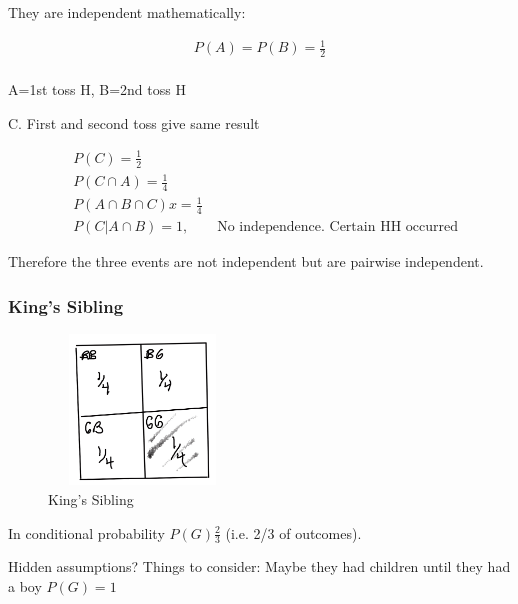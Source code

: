 They are independent mathematically:

\begin{align*}
P(A)=P(B)=\frac{1}{2}\\
\end{align*}

A={1st toss H}, B={2nd toss H}

C. First and second toss give same result

\begin{align*}
&P(C)=\frac{1}{2}\\
&P(C \cap A) = \frac{1}{4}\\
&P(A \cap B \cap C)x = \frac{1}{4}\\
&P(C|A \cap B) = 1, \qquad \text{No independence. Certain HH occurred}
\end{align*}

Therefore the three events are not independent but are pairwise independent.

\subsubsection{King's Sibling}


\begin{figure}[ht]
\centering
\includegraphics[width=5cm, height=4cm]{images/L03/kings_sibling.jpeg}
\caption{King's Sibling}
\end{figure}

In conditional probability $P(G)\frac{2}{3}$ (i.e. 2/3 of outcomes).

Hidden assumptions?  Things to consider: Maybe they had children until they had a boy $P(G)=1$
